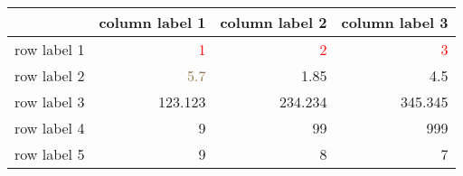 \begin{tabular}{lrrr} 
\toprule 
  	 & 	 column label 1 	 & 	 column label 2 	 & 	 column label 3 \\ 
\midrule 
row label 1 	 & 	 \textcolor[HTML]{FF0000}{1} 	 & 	 \textcolor[HTML]{FF0000}{2} 	 & 	 \textcolor[HTML]{FF0000}{3} \\ 
row label 2 	 & 	 \textcolor[HTML]{907648}{5.7} 	 & 	 1.85 	 & 	 4.5 \\ 
row label 3 	 & 	 123.123 	 & 	 234.234 	 & 	 345.345 \\ 
row label 4 	 & 	 9 	 & 	 99 	 & 	 999 \\ 
row label 5 	 & 	 9 	 & 	 8 	 & 	 7 \\ 
\bottomrule 
\end{tabular}